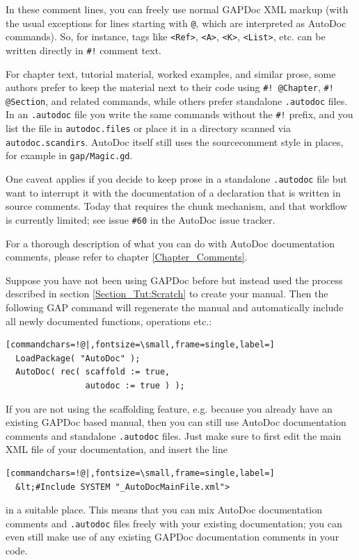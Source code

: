\documentclass[a4paper,11pt]{report}
\begin{document}
{{ In these comment lines, you can freely use normal \textsf{GAPDoc} XML markup (with the usual exceptions for lines starting with \texttt{@}, which are interpreted as \textsf{AutoDoc} commands). So, for instance, tags like \texttt{{\textless}Ref{\textgreater}}, \texttt{{\textless}A{\textgreater}}, \texttt{{\textless}K{\textgreater}}, \texttt{{\textless}List{\textgreater}}, etc. can be written directly in \texttt{\#!} comment text. 

 For chapter text, tutorial material, worked examples, and similar prose, some
authors prefer to keep the material next to their code using \texttt{\#! @Chapter}, \texttt{\#! @Section}, and related commands, while others prefer standalone \texttt{.autodoc} files. In an \texttt{.autodoc} file you write the same commands without the \texttt{\#!} prefix, and you list the file in \texttt{autodoc.files} or place it in a directory scanned via \texttt{autodoc.scan{\textunderscore}dirs}. AutoDoc itself still uses the source\texttt{}comment style in
places, for example in \texttt{gap/Magic.gd}. 

 One caveat applies if you decide to keep prose in a standalone \texttt{.autodoc} file but want to interrupt it with the documentation of a declaration that is
written in source comments. Today that requires the chunk mechanism, and that
workflow is currently limited; see issue \texttt{\#60} in the AutoDoc issue tracker. 

 For a thorough description of what you can do with \textsf{AutoDoc} documentation comments, please refer to chapter \ref{Chapter_Comments}. 

  

  

 Suppose you have not been using \textsf{GAPDoc} before but instead used the process described in section \ref{Section_Tut:Scratch} to create your manual. Then the following \textsf{GAP} command will regenerate the manual and automatically include all newly
documented functions, operations etc.: 

 
\begin{Verbatim}[commandchars=!@|,fontsize=\small,frame=single,label=]
  LoadPackage( "AutoDoc" );
  AutoDoc( rec( scaffold := true,
                autodoc := true ) );
\end{Verbatim}
 

 If you are not using the scaffolding feature, e.g. because you already have an
existing \textsf{GAPDoc} based manual, then you can still use \textsf{AutoDoc} documentation comments and standalone \texttt{.autodoc} files. Just make sure to first edit the main XML file of your documentation,
and insert the line 
\begin{Verbatim}[commandchars=!@|,fontsize=\small,frame=single,label=]
  &lt;#Include SYSTEM "_AutoDocMainFile.xml">
\end{Verbatim}
 in a suitable place. This means that you can mix \textsf{AutoDoc} documentation comments and \texttt{.autodoc} files freely with your existing documentation; you can even still make use of
any existing \textsf{GAPDoc} documentation comments in your code. 

}}
\end{document}
